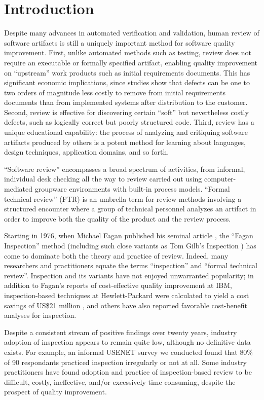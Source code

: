 \section*{Introduction}

Despite many advances in automated verification and validation, human
review of software artifacts is still a uniquely important method for
software quality improvement.  First, unlike automated methods such as
testing, review does not require an executable or formally specified
artifact, enabling quality improvement on ``upstream'' work products such
as initial requirements documents. This has significant economic
implications, since studies show that defects can be one to two orders of
magnitude less costly to remove from initial requirements documents than
from implemented systems after distribution to the customer. Second, review
is effective for discovering certain ``soft'' but nevertheless costly
defects, such as logically correct but poorly structured code.  Third,
review has a unique educational capability: the process of analyzing and
critiquing software artifacts produced by others is a potent method for
learning about languages, design techniques, application domains, and so
forth.


``Software review'' encompasses a broad spectrum of activities, from
informal, individual desk checking all the way to review carried out using
computer-mediated groupware environments with built-in process models.
``Formal technical review'' (FTR) is an umbrella term for review methods
involving a structured encounter where a group of technical personnel
analyzes an artifact in order to improve both the quality of the product
and the review process.

Starting in 1976, when Michael Fagan published his seminal article
\cite{Fagan76}, the ``Fagan Inspection'' method (including such close
variants as Tom Gilb's Inspection \cite{Gilb93}) has come to dominate both
the theory and practice of review.  Indeed, many researchers and
practitioners equate the terms ``inspection'' and ``formal technical
review''.  Inspection and its variants have not enjoyed unwarranted
popularity; in addition to Fagan's reports of cost-effective quality
improvement at IBM, inspection-based techniques at Hewlett-Packard were
calculated to yield a cost savings of US\$21 million \cite{Grady94}, and others have
also reported favorable cost-benefit analyses for inspection.

Despite a consistent stream of positive findings over twenty years,
industry adoption of inspection appears to remain quite low, although no
definitive data exists.  For example, an informal USENET survey we
conducted found that 80\% of 90 respondants practiced inspection
irregularly or not at all.  Some industry practitioners have found adoption
and practice of inspection-based review to be difficult, costly,
ineffective, and/or excessively time consuming, despite the prospect of
quality improvement.

